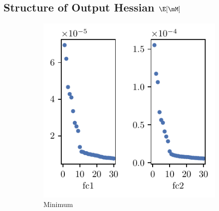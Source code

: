 \subsection{Structure of Output Hessian \texorpdfstring{$\E[\mM]$}{EM}}
\label{sec:struct_M}
\begin{figure}[th]
    \centering
    \begin{subfigure}[b]{0.32\textwidth}
        \centering
        \captionsetup{justification=centering}
        \includegraphics[width=\textwidth]{Figures/Eigenspectrum/UTAU/UTAU_sigval_d30_CIFAR10_Exp1_LeNet5_fixlr0.01R1_E-1_fc1fc2.pdf}
        \caption{Minimum}
        \label{fig:UTAU_spec_minima}
    \end{subfigure}\hfill
    \begin{subfigure}[b]{0.32\textwidth}
        \centering
        \captionsetup{justification=centering}

\end{subfigure}
\end{figure}
